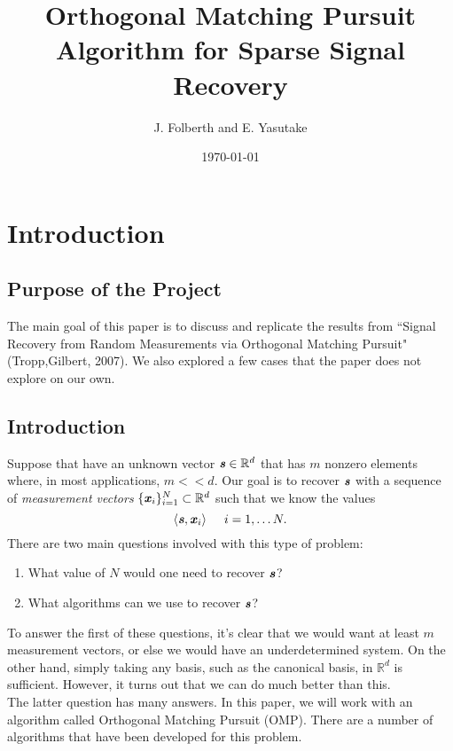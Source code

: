 \documentclass[12pt]{amsart}
\theoremstyle{plain}
\theoremstyle{plain}
\theoremstyle{plain}
\theoremstyle{plain}
\theoremstyle{plain}
\theoremstyle{plain}
\theoremstyle{plain}
\theoremstyle{plain}
\newcommand{\R}{\mathbb{R}}
\newcommand{\s}{\textbf{\emph{s}}}
\newcommand{\x}{\textbf{\emph{x}}}
\begin{document}
\title{Orthogonal Matching Pursuit Algorithm for Sparse Signal Recovery}
\author{J. Folberth and E. Yasutake}
\date{\today}
\maketitle


\tableofcontents

\section{Introduction}

\subsection{Purpose of the Project}
The main goal of this paper is to discuss and replicate the results from ``Signal Recovery from Random Measurements via Orthogonal Matching Pursuit" (Tropp,Gilbert, 2007).  We also explored a few cases that the paper does not explore on our own.  

\subsection{Introduction}
Suppose that have an unknown vector $\s\in\R^d$ that has $m$ nonzero elements where, in most applications, $m<<d$.  Our goal is to recover $\s$ with a sequence of \emph{measurement vectors} $\{\x_i\}_{i=1}^N\subset\R^d$ such that we know the values 
	$$\langle \s,\x_i\rangle \hspace{0.2in} i=1,\ldots N.$$ 
There are two main questions involved with this type of problem:
	\begin{enumerate}
		\item What value of $N$ would one need to recover $\s$?
		\item What algorithms can we use to recover $\s$?\\
	\end{enumerate}
To answer the first of these questions, it's clear that we would want at least $m$ measurement vectors, or else we would have an underdetermined system.  On the other hand, simply taking any basis, such as the canonical basis, in $\R^d$ is sufficient.  However, it turns out that we can do much better than this. \\

The latter question has many answers.  In this paper, we will work with an algorithm called Orthogonal Matching Pursuit (OMP).  There are a number of algorithms that have been developed for this problem.
\end{document}
